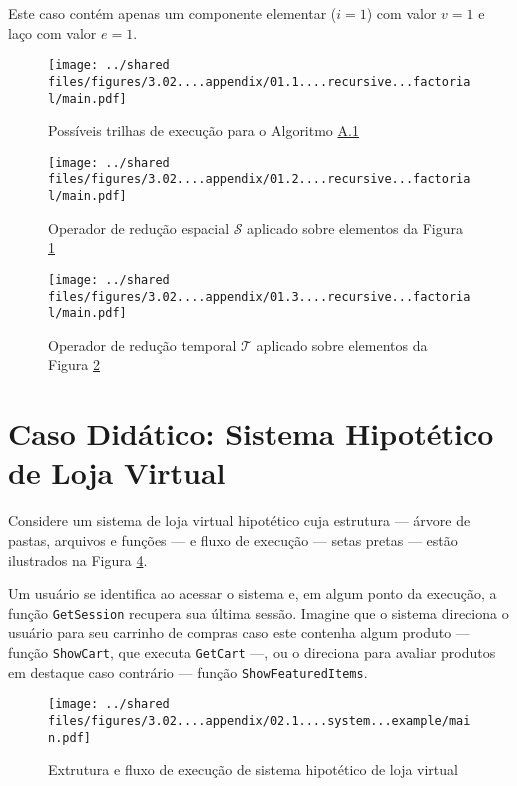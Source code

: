 \begin{apendicesenv}
Este caso contém apenas um componente elementar ($i = 1$) com valor $v = 1$ e
laço com valor $e = 1$.

\begin{figure}[!htb]
    \centering
    \caption{Possíveis trilhas de execução para o Algoritmo \hyperref[Algorithm:RecursiveFactorial]{A.1}}
    \texttt{[image: ../shared files/figures/3.02....appendix/01.1....recursive...factorial/main.pdf]}
    \label{Figure:RecursiveFatorialTraces}
\end{figure}

\begin{figure}[!htb]
    \centering
    \caption{Operador de redução espacial $\mathcal{S}$ aplicado sobre elementos da Figura \ref{Figure:RecursiveFatorialTraces}}
    \texttt{[image: ../shared files/figures/3.02....appendix/01.2....recursive...factorial/main.pdf]}
    \label{Figure:RecursiveFatorialSpatialReducedTraces}
\end{figure}

\begin{figure}[!htb]
    \centering
    \caption{Operador de redução temporal $\mathcal{T}$ aplicado sobre elementos da Figura \ref{Figure:RecursiveFatorialSpatialReducedTraces}}
    \texttt{[image: ../shared files/figures/3.02....appendix/01.3....recursive...factorial/main.pdf]}
    \label{Figure:RecursiveFatorialCase}
\end{figure}

\section{Caso Didático: Sistema Hipotético de Loja Virtual}

Considere um sistema de loja virtual hipotético cuja estrutura --- árvore de
pastas, arquivos e funções --- e fluxo de execução --- setas pretas --- estão
ilustrados na Figura \ref{Figure:StrutctureExecutionFlowStore}.

Um usuário se identifica ao acessar o sistema e, em algum ponto da execução, a
função \texttt{GetSession} recupera sua última sessão.
Imagine que o sistema direciona o usuário para seu carrinho de compras caso este
contenha algum produto --- função \texttt{ShowCart}, que executa
\texttt{GetCart} ---, ou o direciona para avaliar produtos em destaque caso
contrário --- função \texttt{ShowFeaturedItems}.

\begin{figure}[!htb]
    \centering
    \caption{Extrutura e fluxo de execução de sistema hipotético de loja virtual}
    \texttt{[image: ../shared files/figures/3.02....appendix/02.1....system...example/main.pdf]}
    \label{Figure:StrutctureExecutionFlowStore}
\end{figure}


\end{apendicesenv}
